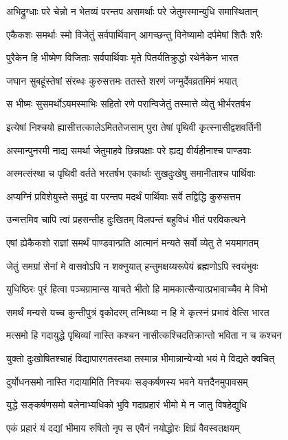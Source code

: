 \twolineshloka
{अभिद्रुग्धाः परे चेन्नो न भेतव्यं परन्तप}
{असमर्थाः परे जेतुमस्मान्युधि समास्थितान्}


\twolineshloka
{एकैकशः समर्थाः स्मो विजेतुं सर्वपार्थिवान्}
{आगच्छन्तु विनेष्यामो दर्पमेषां शितैः शरैः}


\twolineshloka
{पुरैकेन हि भीष्मेण विजिताः सर्वपार्थिवाः}
{मृते पितर्यतिक्रुद्धो रथेनैकेन भारत}


\twolineshloka
{जघान सुबहूंस्तेषां संरब्धः कुरुसत्तमः}
{ततस्ते शरणं जग्मुर्देवव्रतमिमं भयात्}


\twolineshloka
{स भीष्मः सुसमर्थोऽयमस्माभिः सहितो रणे}
{परान्विजेतुं तस्मात्ते व्येतु भीर्भरतर्षभ}


\twolineshloka
{इत्येषां निश्चयो ह्यासीत्तत्कालेऽमिततेजसाम्}
{पुरा तेषां पृथिवी कृत्स्नासीद्वशवर्तिनी}


\twolineshloka
{अस्मान्पुनरमी नाद्य समर्था जेतुमाहवे}
{छिन्नपक्षाः परे ह्यद्य वीर्यहीनाश्च पाण्डवाः}


\twolineshloka
{अस्मत्संस्था च पृथिवी वर्तते भरतर्षभ}
{एकार्थाः सुखदुःखेषु समानीताश्च पार्थिवाः}


\twolineshloka
{अप्यग्निं प्रविशेयुस्ते समुद्रं वा परन्तप}
{मदर्थं पार्थिवाः सर्वे तद्विद्धि कुरुसत्तम}


\twolineshloka
{उन्मत्तमिव चापि त्वां प्रहसन्तीह दुःखितम्}
{विलपन्तं बहुविधं भीतं परविकत्थने}


\twolineshloka
{एषां ह्येकैकशो राज्ञां समर्थं पाण्डवान्प्रति}
{आत्मानं मन्यते सर्वो व्येतु ते भयमागतम्}


\twolineshloka
{जेतुं समग्रां सेनां मे वासवोऽपि न शक्नुयात्}
{हन्तुमक्षय्यरूपेयं ब्रह्मणोऽपि स्वयंभुवः}


\twolineshloka
{युधिष्ठिरः पुरं हित्वा पञ्चग्रामान्स याचते}
{भीतो हि मामकात्सैन्यात्प्रभावाच्चैव मे विभो}


\twolineshloka
{समर्थं मन्यसे यच्च कुन्तीपुत्रं वृकोदरम्}
{तन्मिथ्या न हि मे कृत्स्नं प्रभावं वेत्सि भारत}


\twolineshloka
{मत्समो हि गदायुद्धे पृथिव्यां नास्ति कश्चन}
{नासीत्कश्चिदतिक्रान्तो भविता न च कश्चन}


\twolineshloka
{युक्तो दुःखोषितश्चाहं विद्यापारगतस्तथा}
{तस्मान्न भीमान्नान्येभ्यो भयं मे विद्यते क्वचित्}


\threelineshloka
{दुर्योधनसमो नास्ति गदायामिति निश्चयः}
{सङ्कर्षणस्य भवने यत्तदैनमुपावसम्}
{}


\twolineshloka
{युद्धे सङ्कर्षणसमो बलेनाभ्यधिको भुवि}
{गदाप्रहारं भीमो मे न जातु विषहेद्युधि}


\twolineshloka
{एकं प्रहारं यं दद्यां भीमाय रुषितो नृप}
{स एवैनं नयोद्धोरः क्षिप्रं वैवस्वतक्षयम्}


